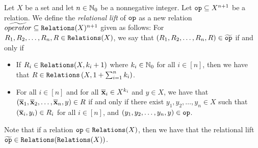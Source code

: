 \begin{definition}\label{def:relationalLift}
    Let $X$ be a set and let $n \in \mathbb{N}_0$ be a nonnegative integer. Let $\texttt{op} \subseteq X^{n+1}$ be a relation. We define the \emph{relational lift} of $\texttt{op}$ as a new relation $\widetilde{operator} \subseteq \texttt{Relations}(X)^{n+1}$ given as follows: For $R_1, R_2, \dots, R_n, R \in \texttt{Relations}(X)$, we say that $(R_1, R_2, \dots, R_n, R) \in \widetilde{\texttt{op}}$ if and only if
    \begin{itemize}
        \item If $R_i \in \texttt{Relations}(X, k_i+1)$ where $k_i \in \mathbb{N}_0$ for all $i \in [n]$, then we have that $R \in \texttt{Relations}\left(X, 1 + \sum_{i=1}^n k_i\right)$.
        \item For all $i \in [n]$ and for all $\overline{\textbf{x}}_i \in X^{k_i}$ and $y \in X$, we have that $(\overline{\textbf{x}}_1, \overline{\textbf{x}}_2, \dots, \overline{\textbf{x}}_n, y) \in R$ if and only if there exist $y_1, y_2, \dots, y_n \in X$ such that $(\overline{\textbf{x}}_i, y_i) \in R_i$ for all $i \in [n]$, and $(y_1, y_2, \dots, y_n, y) \in \texttt{op}$.
    \end{itemize}
\end{definition}

Note that if a relation $\texttt{op} \in \texttt{Relations}(X)$, then we have that the relational lift $\widetilde{\texttt{op}} \in \texttt{Relations}(\texttt{Relations}(X))$.